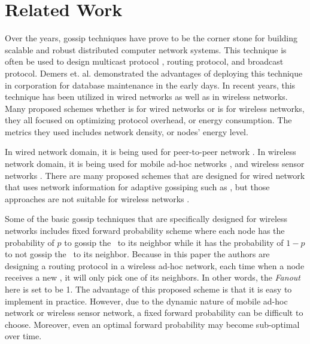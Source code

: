 \chapter{Related Work}
\label{Chapter2}

Over the years, gossip techniques have prove to be the corner stone for building scalable and robust distributed computer network systems. This technique is often be used to design multicast protocol \cite{gossip} \cite{gupta2002efficient}, routing protocol, and broadcast protocol. Demers et. al. \cite{demers1987epidemic} demonstrated the advantages of deploying this technique in corporation for database maintenance in the early days. In recent years, this technique has been utilized in wired networks \cite{birman1999bimodal} as well as in wireless networks. Many proposed schemes whether is for wired networks or is for wireless networks, they all focused on optimizing protocol overhead, or energy consumption. The metrics they used includes network density, or nodes' energy level. 

In wired network domain, it is being used for peer-to-peer network \cite{gupta2002efficient}. In wireless network domain, it is being used for mobile ad-hoc networks \cite{vahdat2000epidemic} \cite{chandra2001anonymous}, and wireless sensor networks \cite{levis2004trickle} \cite{miller2005exploring}. There are many proposed schemes that are designed for wired network that uses network information for adaptive gossiping such as \cite{kempe2004spatial} \cite{rodrigues2003adaptive}, but those approaches are not suitable for wireless networks \cite{smart}. 

Some of the basic gossip techniques that are specifically designed for wireless networks includes fixed forward probability scheme \cite{haas2006gossip} where each node has the probability of $p$ to gossip the \msg ~to its neighbor while it has the probability of $1-p$ to not gossip the \msg ~to its neighbor. Because in this paper the authors are designing a routing protocol in a wireless ad-hoc network, each time when a node receives a new \msg, it will only pick one of its neighbors. In other words, the \emph{Fanout} here is set to be 1. The advantage of this proposed scheme is that it is easy to implement in practice. However, due to the dynamic nature of mobile ad-hoc network or wireless sensor network, a fixed forward probability can be difficult to choose. Moreover, even an optimal forward probability may become sub-optimal over time. 

